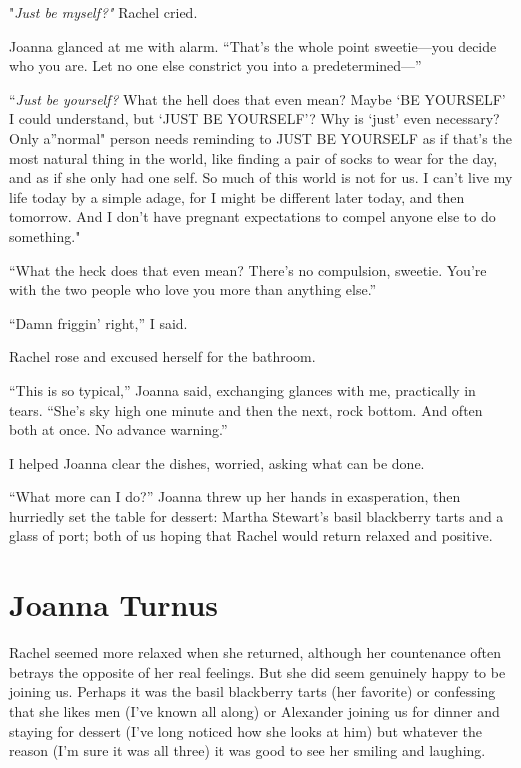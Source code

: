 "\emph{Just be myself?"} Rachel cried.

Joanna glanced at me with alarm. ``That's the whole point sweetie---you
decide who you are. Let no one else constrict you into a
predetermined---''

``\emph{Just be yourself?} What the hell does that even mean? Maybe `BE
YOURSELF' I could understand, but `JUST BE YOURSELF'? Why is `just' even
necessary? Only a''normal" person needs reminding to JUST BE YOURSELF as
if that's the most natural thing in the world, like finding a pair of
socks to wear for the day, and as if she only had one self. So much of
this world is not for us. I can't live my life today by a simple adage,
for I might be different later today, and then tomorrow. And I don't
have pregnant expectations to compel anyone else to do something."

``What the heck does that even mean? There's no compulsion, sweetie.
You're with the two people who love you more than anything else.''

``Damn friggin' right,'' I said.

Rachel rose and excused herself for the bathroom.

``This is so typical,'' Joanna said, exchanging glances with me,
practically in tears. ``She's sky high one minute and then the next,
rock bottom. And often both at once. No advance warning.''

I helped Joanna clear the dishes, worried, asking what can be done.

``What more can I do?'' Joanna threw up her hands in exasperation, then
hurriedly set the table for dessert: Martha Stewart's basil blackberry
tarts and a glass of port; both of us hoping that Rachel would return
relaxed and positive.

\chapter{Joanna Turnus}

\titlemark

Rachel seemed more relaxed when she returned, although her countenance
often betrays the opposite of her real feelings. But she did seem
genuinely happy to be joining us. Perhaps it was the basil blackberry
tarts (her favorite) or confessing that she likes men (I've known all
along) or Alexander joining us for dinner and staying for dessert (I've
long noticed how she looks at him) but whatever the reason (I'm sure it
was all three) it was good to see her smiling and laughing.

